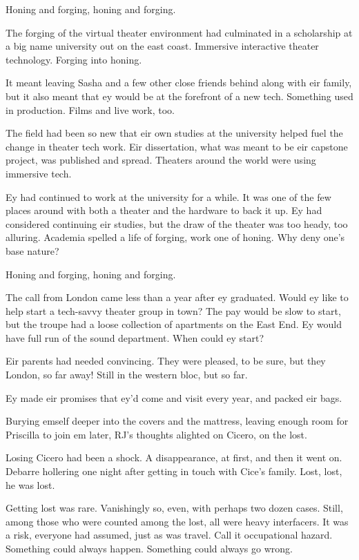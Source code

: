 Honing and forging, honing and forging.

The forging of the virtual theater environment had culminated in a scholarship at a big name university out on the east coast. Immersive interactive theater technology. Forging into honing.

It meant leaving Sasha and a few other close friends behind along with eir family, but it also meant that ey would be at the forefront of a new tech. Something used in production. Films and live work, too.

The field had been so new that eir own studies at the university helped fuel the change in theater tech work. Eir dissertation, what was meant to be eir capstone project, was published and spread. Theaters around the world were using immersive tech.

Ey had continued to work at the university for a while. It was one of the few places around with both a theater and the hardware to back it up. Ey had considered continuing eir studies, but the draw of the theater was too heady, too alluring. Academia spelled a life of forging, work one of honing. Why deny one's base nature?

Honing and forging, honing and forging.

The call from London came less than a year after ey graduated. Would ey like to help start a tech-savvy theater group in town? The pay would be slow to start, but the troupe had a loose collection of apartments on the East End. Ey would have full run of the sound department. When could ey start?

Eir parents had needed convincing. They were pleased, to be sure, but they London, so far away! Still in the western bloc, but so far.

Ey made eir promises that ey'd come and visit every year, and packed eir bags.

Burying emself deeper into the covers and the mattress, leaving enough room for Priscilla to join em later, RJ's thoughts alighted on Cicero, on the lost.

Losing Cicero had been a shock. A disappearance, at first, and then it went on. Debarre hollering one night after getting in touch with Cice's family. Lost, lost, he was lost.

Getting lost was rare. Vanishingly so, even, with perhaps two dozen cases. Still, among those who were counted among the lost, all were heavy interfacers. It was a risk, everyone had assumed, just as was travel. Call it occupational hazard. Something could always happen. Something could always go wrong.

